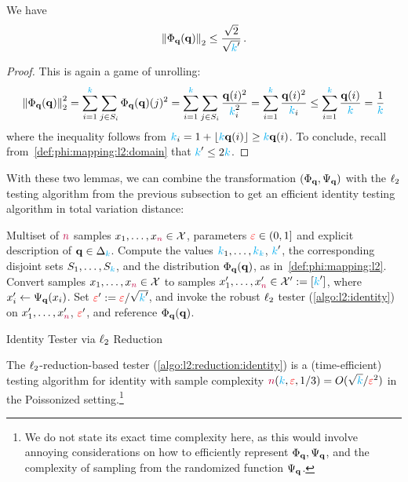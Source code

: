 \begin{lemma}
	\label{lemma:l2:reduction:l2norm}
	We have
	\[	
		\normtwo{\Phi_\q(\q)} \leq \frac{\sqrt{2}}{\sqrt{\ab'}}\,.
	\]
\end{lemma}
\begin{proof}
This is again a game of unrolling:
\begin{align*}
	\normtwo{\Phi_\q(\q)}^2 
	= \sum_{i=1}^{\ab} \sum_{j\in S_i} \Phi_\q(\q)(j)^2
	= \sum_{i=1}^{\ab} \sum_{j\in S_i} \frac{\q(i)^2}{\ab_i^2}
	= \sum_{i=1}^{\ab} \frac{\q(i)^2}{\ab_i}
	\leq \sum_{i=1}^{\ab} \frac{\q(i)}{\ab} = \frac{1}{\ab}
\end{align*}
where the inequality follows from $\ab_i = 1+\flr{\ab\q(i)} \geq \ab\q(i)$. To conclude, recall from~\cref{def:phi:mapping:l2:domain} that $\ab' \leq 2\ab$.
\end{proof}
With these two lemmas, we can combine the transformation $(\Phi_\q,\Psi_\q)$ with the $\lp[2]$ testing algorithm from the previous subsection to get an efficient identity testing algorithm in total variation distance:
\begin{algorithm}[ht!]
  \begin{algorithmic}[1]
    \Require Multiset of $\ns$ samples $x_1,\dots,x_\ns \in \domain$, parameters $\dst\in(0,1]$ and explicit description of $\q\in\distribs{\ab}$.
    \State Compute the values $\ab_1,\dots,\ab_\ab$, $\ab'$, the corresponding disjoint sets $S_1,\dots,S_\ab$, and the distribution $\Phi_\q(\q)$, as in~\cref{def:phi:mapping:l2}.
    \State Convert samples $x_1,\dots,x_\ns \in \domain$ to samples $x'_1,\dots,x'_\ns \in \domain' \eqdef [\ab']$, where $x'_i \gets \Psi_\q(x_i)$. 
    \State Set $\dst' \eqdef \dst/\sqrt{\ab'}$, and invoke the robust $\lp[2]$ tester (\cref{algo:l2:identity}) on $x'_1,\dots,x'_\ns$, $\dst'$, and reference $\Phi_\q(\q)$.
     \Return \reject {}
    \Else\ 
      \Return \accept {}
    \EndIf
  \end{algorithmic}
  \caption{\label{algo:l2:reduction:identity}\sc Identity Tester via $\lp[2]$ Reduction}
\end{algorithm}
\begin{theorem}
  \label{theo:l2:reduction}
The $\lp[2]$-reduction-based tester (\cref{algo:l2:reduction:identity}) is a (time-efficient) testing algorithm for identity with sample complexity $\ns(\ab,\dst,1/3) = O(\sqrt{\ab}/\dst^2)$ in the Poissonized setting.\footnote{We do not state its exact time complexity here, as this would involve annoying considerations on how to efficiently represent $\Phi_\q,\Psi_\q$, and the complexity of sampling from the randomized function $\Psi_\q$.}
\end{theorem}
